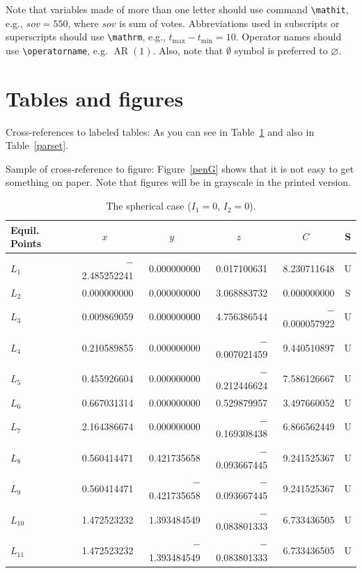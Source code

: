 \documentclass[qe,nameyear,final,supplement,openaccess]{econsocart}
\theoremstyle{plain}
\begin{document}
Note that variables made of more than one letter should use command \texttt{{\textbackslash}mathit},
e.g., $\mathit{sov}=550$, where $\mathit{sov}$ is sum of votes. Abbreviations used in subscripts or superscripts should use \texttt{{\textbackslash}mathrm},
e.g., $t_{\mathrm{max}} -t_{\mathrm{min}} =10$. Operator names should use \texttt{{\textbackslash}operatorname}, e.g. $\operatorname{AR}(1)$. Also, note that $\emptyset$ symbol is preferred to $\varnothing$.

\section{Tables and figures}

Cross-references to labeled tables: As you can see in Table~\ref{sphericcase}
and also in Table~\ref{parset}.

Sample of cross-reference to figure: Figure~\ref{penG} shows that it is not easy to get something on paper. Note that figures will be in grayscale in the printed version.


\begin{table}
\caption{The spherical case ($I_1=0$, $I_2=0$).}
\label{sphericcase}
\begin{tabular}{@{}lrrrrc@{}@{}}
\hline
Equil. Points
& \multicolumn{1}{c}{$x$}
& \multicolumn{1}{c}{$y$}
& \multicolumn{1}{c}{$z$}
& \multicolumn{1}{c}{$C$}
& S \\
\hline
$L_1$    & $-$2.485252241 & 0.000000000    & 0.017100631    & 8.230711648    & U \\
$L_2$    & 0.000000000    & 0.000000000    & 3.068883732    & 0.000000000    & S \\
$L_3$    & 0.009869059    & 0.000000000    & 4.756386544    & $-$0.000057922 & U \\
$L_4$    & 0.210589855    & 0.000000000    & $-$0.007021459 & 9.440510897    & U \\
$L_5$    & 0.455926604    & 0.000000000    & $-$0.212446624 & 7.586126667    & U \\
$L_6$    & 0.667031314    & 0.000000000    & 0.529879957    & 3.497660052    & U \\
$L_7$    & 2.164386674    & 0.000000000    & $-$0.169308438 & 6.866562449    & U \\
$L_8$    & 0.560414471    & 0.421735658    & $-$0.093667445 & 9.241525367    & U \\
$L_9$    & 0.560414471    & $-$0.421735658 & $-$0.093667445 & 9.241525367    & U \\
$L_{10}$ & 1.472523232    & 1.393484549    & $-$0.083801333 & 6.733436505    & U \\
$L_{11}$ & 1.472523232    & $-$1.393484549 & $-$0.083801333 & 6.733436505    & U \\
\hline
\end{tabular}

\end{table}
\end{document}
